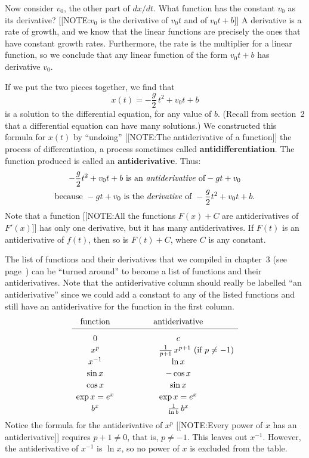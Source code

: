 Now consider $v_0$, the other part of $dx/dt$.  What function has the
constant $v_0$ as its derivative?
[[NOTE:$v_0$ is the derivative  of $v_0t$ and of $v_0t + b$]] 
A derivative is a rate of growth, and we know that the linear functions
are precisely the ones that have constant growth rates.  Furthermore,
the rate is the multiplier for a linear function, so we conclude that
any linear function of the form $v_0 t + b$ has derivative $v_0$.

If we put the two pieces together, we find that 
\[
x(t) = -\dfrac{g}{2} \, t^2 + v_0 t + b
\]
is a solution to the differential equation, for any value of $b$.
(Recall from section~2 that a differential equation can have many
solutions.)  We constructed this formula for $x(t)$ by ``undoing''
[[NOTE:The antiderivative  of a function]]
the process of differentiation, a process sometimes called {\bf
  antidifferentiation}. The function
produced is called an {\bf antiderivative}.
Thus:
\begin{gather*}
-\dfrac{g}{2} t^2 + v_0 t + b 
              \text{ is an \emph{antiderivative} of} -gt + v_0 \\
\text{because }
-gt + v_0 \text{ is the \emph{derivative} of } -\dfrac{g}{2} t^2 + v_0 t + b.
\end{gather*}
Note that a function 
        [[NOTE:All the functions $F(x) +C$ are antiderivatives of $F'(x)$]]
has only one derivative, but it has many antiderivatives.  If $F(t)$ is an antiderivative of $f(t)$, then so is $F(t) + C$, where $C$ is any constant.

\enlargethispage*{22pt}

The list of functions and their derivatives that we compiled in
chapter~3 (see page~\pageref{basic derivs}) can be ``turned around''
to become a list of functions and their antiderivatives.  Note that
the antiderivative column should really be labelled ``an
antiderivative'' since we could add a constant to any of the listed
functions and still have an antiderivative for the function in the
first column.  \addtolength{\arraycolsep}{8pt}
        \[
\begin{array}{cc}
        \mbox{function} & \mbox{antiderivative} \\[2pt] \hline
        \rule{0pt}{14pt} 0 \rule{0pt}{14pt} & c \\[2pt]
        x^p & \hspace*{.6in} \frac{1}{p+1} \, x^{p+1} 
                         \mbox{ (if $p\neq -1$)}\\[2pt]
        x^{-1} & \ln{x} \\[2pt]
        \sin{x} & -\cos{x} \\[2pt]
        \cos{x} & \sin{x} \\[2pt]
        \exp{x} = e^x & \exp{x} = e^x \\[2pt]
        b^x & \frac{1}{\ln{b}}\, b^x 
        \end{array}
\]
        \addtolength{\arraycolsep}{-8pt}%
Notice the formula for the antiderivative of $x^p$ 
[[NOTE:Every power of $x$ has an antiderivative]]
requires $p+1 \neq 0$, that is, $p \neq -1$.  This leaves out
$x^{-1}$.  However, the antiderivative of $x^{-1}$ is $\ln{x}$, so no
power of $x$ is excluded from the table.


